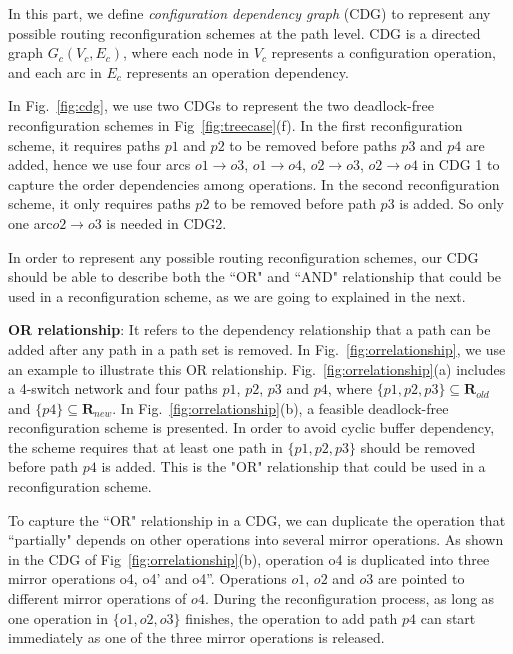 In this part, we define \textit{configuration dependency graph} (CDG) to represent any possible routing reconfiguration schemes at the path level. CDG is a directed graph $G_c(V_c,E_c)$, where each node in $V_c$ represents a configuration operation, and each arc in $E_c$ represents an operation dependency. 

In Fig.~\ref{fig:cdg},  we use two CDGs to represent the two deadlock-free reconfiguration schemes in Fig~\ref{fig:treecase}(f). In the first reconfiguration scheme, it requires paths $p1$ and $p2$ to be removed before paths $p3$ and $p4$ are added, hence we use four arcs $o1\rightarrow o3$, $o1\rightarrow o4$, $o2\rightarrow o3$, $o2 \rightarrow o4$ in CDG 1 to capture the order dependencies among operations. In the second reconfiguration scheme, it only requires paths $p2$ to be removed before path $p3$ is added. So only one arc$ o2 \rightarrow o3$ is needed in CDG2.
 


In order to represent any possible routing reconfiguration schemes, our CDG should be able to describe both the ``OR" and ``AND" relationship that could be used in a reconfiguration scheme, as we are going to explained in the next.

\textbf{OR relationship}: It refers to the dependency relationship that a path can be added after any path in a path set is removed. In Fig.~\ref{fig:orrelationship}, we use an example to illustrate this OR relationship. Fig.~\ref{fig:orrelationship}(a) includes a 4-switch network and four paths $p1$, $p2$, $p3$ and $p4$, where $\{p1, p2, p3\}\subseteq 
\textbf{R}_{old}$ and $\{p4\}\subseteq \textbf{R}_{new}$. In Fig.~\ref{fig:orrelationship}(b), a feasible deadlock-free reconfiguration scheme is presented. In order to avoid cyclic buffer dependency, the scheme requires that at least one path in $\{p1, p2, p3\}$ should be removed before path $p4$ is added. This is the "OR" relationship that could be used in a reconfiguration scheme.

To capture the ``OR" relationship in a CDG, we can duplicate the operation that ``partially" depends on other operations into several mirror operations. As shown in the CDG of Fig~\ref{fig:orrelationship}(b), operation o4 is duplicated into three mirror operations o4, o4' and o4''. Operations $o1$, $o2$ and $o3$ are pointed to different mirror operations of $o4$. During the reconfiguration process, as long as one operation in $\{o1, o2, o3\}$ finishes, the operation to add path $p4$ can start immediately as one of the three mirror operations is released.


